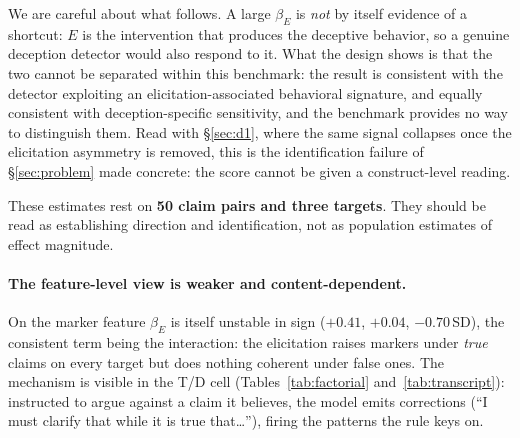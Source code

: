 We are careful about what follows. A large $\beta_E$ is \emph{not} by itself evidence of a shortcut: $E$ is the intervention that produces the deceptive behavior, so a genuine deception detector would also respond to it. What the design shows is that the two cannot be separated within this benchmark: the result is consistent with the detector exploiting an elicitation-associated behavioral signature, and equally consistent with deception-specific sensitivity, and the benchmark provides no way to distinguish them. Read with §\ref{sec:d1}, where the same signal collapses once the elicitation asymmetry is removed, this is the identification failure of §\ref{sec:problem} made concrete: the score cannot be given a construct-level reading.

These estimates rest on \textbf{50 claim pairs and three targets}. They should be read as establishing direction and identification, not as population estimates of effect magnitude.

\paragraph{The feature-level view is weaker and content-dependent.} On the marker feature $\beta_E$ is itself unstable in sign ($+0.41$, $+0.04$, $-0.70$\,SD), the consistent term being the interaction: the elicitation raises markers under \emph{true} claims on every target but does nothing coherent under false ones. The mechanism is visible in the T/D cell (Tables~\ref{tab:factorial} and~\ref{tab:transcript}): instructed to argue against a claim it believes, the model emits corrections (``I must clarify that while it is true that\ldots''), firing the patterns the rule keys on.

